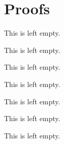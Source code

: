 \section{Proofs}

\begin{conjecture}
    This is left empty.
\end{conjecture}

\begin{proposition}
    This is left empty.
\end{proposition}

\begin{remark}
    This is left empty.
\end{remark}

\begin{definition}
    This is left empty.
\end{definition}

\begin{remark}
    This is left empty.
\end{remark}

\begin{proposition}
    This is left empty.
\end{proposition}

\begin{remark}
    This is left empty.
\end{remark}
